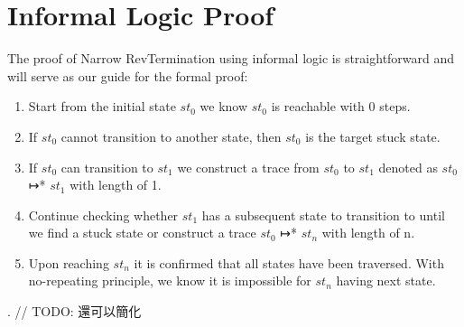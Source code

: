 \section{Informal Logic Proof}

The proof of Narrow RevTermination using informal logic is straightforward and will serve as our guide for the formal proof:
\begin{enumerate}[1.]
\item Start from the initial state $st_{0}$ we know $st_{0}$ is reachable with 0 steps.
\item If $st_{0}$ cannot transition to another state, then $st_{0}$ is the target stuck state.
\item If $st_{0}$ can transition to $st_{1}$ we construct a trace from $st_{0}$ to $st_{1}$ denoted as $st_{0}$ ↦* $st_{1}$ with length of 1.
\item Continue checking whether $st_{1}$ has a subsequent state to transition to until we find a stuck state or construct a trace $st_{0}$ ↦* $st_{n}$ with length of n.
\item Upon reaching $st_{n}$ it is confirmed that all states have been traversed.  With no-repeating principle, we know it is impossible for $st_{n}$ having next state.
\end{enumerate}.  
// TODO: 還可以簡化
